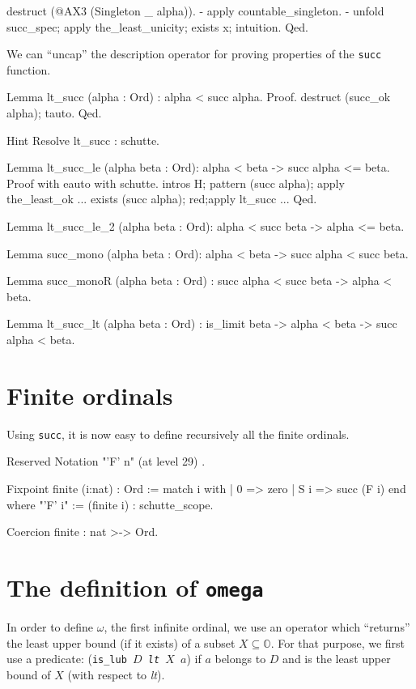 \documentclass[a4paper]{book}
\begin{document}
{\begin{Coqsrc}
  destruct (@AX3 (Singleton _ alpha)).
  - apply countable_singleton.
  -  unfold succ_spec; apply the_least_unicity;  exists x; intuition.
Qed.     
\end{Coqsrc}


We can ``uncap'' the description operator for proving properties of the
\texttt{succ} function.

\begin{Coqsrc}
Lemma lt_succ (alpha : Ord) :  alpha < succ alpha.
Proof.
  destruct  (succ_ok  alpha);  tauto.
Qed.

Hint Resolve lt_succ : schutte.

Lemma lt_succ_le (alpha beta : Ord):
  alpha < beta -> succ alpha <= beta.
Proof with eauto with schutte.
  intros  H;  pattern (succ alpha); apply the_least_ok ... 
  exists (succ alpha); red;apply lt_succ ...
Qed.
\end{Coqsrc}


\begin{Coqsrc}
Lemma lt_succ_le_2 (alpha beta : Ord):
  alpha < succ beta -> alpha <= beta.

Lemma succ_mono (alpha beta : Ord):
  alpha < beta -> succ alpha < succ beta.

Lemma succ_monoR (alpha beta : Ord) :
 succ alpha < succ beta -> alpha < beta.

Lemma lt_succ_lt (alpha beta : Ord) :
  is_limit beta ->  alpha < beta -> succ alpha < beta.
\end{Coqsrc}

\section{Finite ordinals}

Using \texttt{succ}, it is now easy to define recursively all the finite ordinals.

\label{sect:notation-F-sch}

\begin{Coqsrc}
Reserved Notation "'F' n" (at level 29) .

Fixpoint finite (i:nat) : Ord :=
  match i with 
            | 0 => zero
            | S i => succ (F i)
  end
where "'F' i" := (finite i)  : schutte_scope.

Coercion finite : nat >-> Ord.
\end{Coqsrc}

\section{The definition of \texttt{omega}}
In order to define $\omega$, the first infinite ordinal, we use an operator which
``returns'' the least upper bound (if it exists) of a subset $X\subseteq \mathbb{O}$.
For that purpose, we first use a predicate:
(\texttt{is\_lub $D$ \textit{lt} $X$ $a$}) if $a$ belongs to $D$ and is the least 
upper bound  of $X$ (with respect to \textit{lt}).


}
\end{document}
